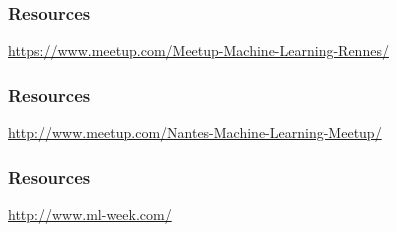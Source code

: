 \begin{frame}
  \vspace{-8cm}
  \vspace{7cm}
\end{frame}

\begin{frame}
\end{frame}

\begin{frame}
\end{frame}

\begin{frame}
\end{frame}

\begin{frame}
\end{frame}

\begin{frame}
  \vspace{-8cm}
  \vspace{7cm}
\end{frame}




\begin{frame}
  \frametitle{Resources}

  \vspace{5mm}
  \centerline{\url{https://www.meetup.com/Meetup-Machine-Learning-Rennes/}}
\end{frame}

\begin{frame}
  \frametitle{Resources}

  \vspace{5mm}
  \centerline{\url{http://www.meetup.com/Nantes-Machine-Learning-Meetup/}}
\end{frame}

\begin{frame}
  \frametitle{Resources}

  \vspace{5mm}
  \centerline{\url{http://www.ml-week.com/}}
\end{frame}

\begin{frame}
\end{frame}


